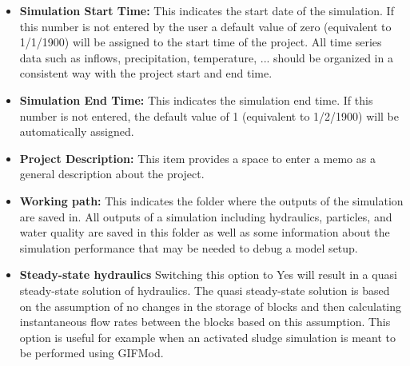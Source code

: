 \begin{itemize}
\item %
\textbf{Simulation Start Time: } This indicates the start date of the simulation. If this number is not entered by the user a default value of zero (equivalent to 1/1/1900) will be assigned to the start time of the project. All time series data such as inflows, precipitation, temperature, ... should be organized in a consistent way with the project start and end time. %
\item %
\textbf{Simulation End Time: } This indicates the simulation end time. If this number is not entered, the default value of 1 (equivalent to 1/2/1900) will be automatically assigned. 
\item \textbf{Project Description: } This item provides a space to enter a memo as a general description about the project. %
\item %
\textbf{Working path: } This indicates the folder where the outputs of the simulation are saved in. All outputs of a simulation including hydraulics, particles, and water quality are saved in this folder as well as some information about the simulation performance that may be needed to debug a model setup. %
\item %
\textbf{Steady-state hydraulics} Switching this option to Yes will result in a quasi steady-state solution of hydraulics. The quasi steady-state solution is based on the assumption of no changes in the storage of blocks and then calculating instantaneous flow rates between the blocks based on this assumption. This option is useful for example when an activated sludge simulation is meant to be performed using GIFMod. %
\end{itemize}
